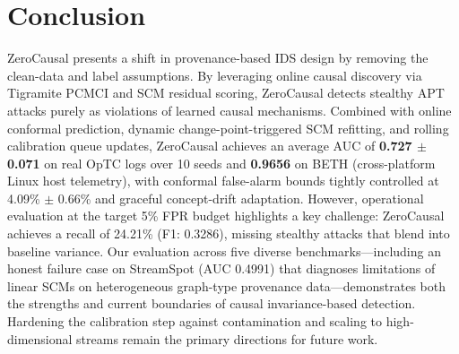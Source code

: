 \section{Conclusion}
ZeroCausal presents a shift in provenance-based IDS design by removing the clean-data and label assumptions. By leveraging online causal discovery via Tigramite PCMCI and SCM residual scoring, ZeroCausal detects stealthy APT attacks purely as violations of learned causal mechanisms. Combined with online conformal prediction, dynamic change-point-triggered SCM refitting, and rolling calibration queue updates, ZeroCausal achieves an average AUC of \textbf{0.727 $\pm$ 0.071} on real OpTC logs over 10 seeds and \textbf{0.9656} on BETH (cross-platform Linux host telemetry), with conformal false-alarm bounds tightly controlled at 4.09\% $\pm$ 0.66\% and graceful concept-drift adaptation. However, operational evaluation at the target 5\% FPR budget highlights a key challenge: ZeroCausal achieves a recall of 24.21\% (F1: 0.3286), missing stealthy attacks that blend into baseline variance. Our evaluation across five diverse benchmarks---including an honest failure case on StreamSpot (AUC 0.4991) that diagnoses limitations of linear SCMs on heterogeneous graph-type provenance data---demonstrates both the strengths and current boundaries of causal invariance-based detection. Hardening the calibration step against contamination and scaling to high-dimensional streams remain the primary directions for future work.
